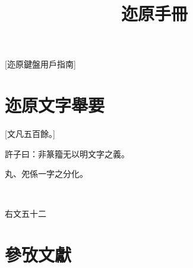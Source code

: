 \documentclass{zhvt-classic}
\title{迩原手冊}
\begin{document}
[迩原鍵盤用戶指南]

\cleardoublepage

\setcounter{page}{1}
\tableofcontents

\mainmatter

\chapter*{迩原文字舉要}[文凡五百餘。]

\begin{fw}
許子曰：非篆籀无以明文字之義。
\end{fw}

丸、夗係一字之分化。\cite{侯乃峯夗丸,鄔可晶續釋丸}

𧮫、希之上部係一文。\cite{安大簡絺綌,季旭昇絺綌,程燕𧮫}

\begin{fw}
右文五十二
\end{fw}

\chapter*{參攷文獻}
\printbibliography[heading=none]
\end{document}
